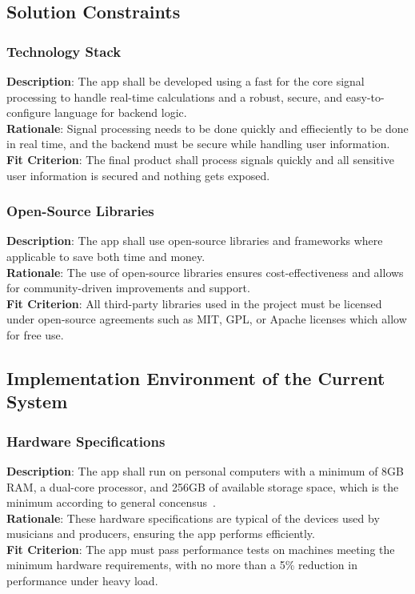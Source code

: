 \documentclass[12pt]{article}
\begin{document}
\subsection{Solution Constraints}
\subsubsection*{Technology Stack}
\textbf{Description}: The app shall be developed using a fast for the core signal processing to handle real-time calculations and a robust, secure, and easy-to-configure language for backend logic.\\
\textbf{Rationale}: Signal processing needs to be done quickly and effieciently to be done in real time, and the backend must be secure while handling user information.\\
\textbf{Fit Criterion}: The final product shall process signals quickly and all sensitive user information is secured and nothing gets exposed.
\subsubsection*{Open-Source Libraries}
\textbf{Description}: The app shall use open-source libraries and frameworks where applicable to save both time and money.\\
\textbf{Rationale}: The use of open-source libraries ensures cost-effectiveness and allows for community-driven improvements and support.\\
\textbf{Fit Criterion}: All third-party libraries used in the project must be licensed under open-source agreements such as MIT, GPL, or Apache licenses which allow for free use.

\subsection{Implementation Environment of the Current System}
\subsubsection*{Hardware Specifications}
\textbf{Description}: The app shall run on personal computers with a minimum of 8GB RAM, a dual-core processor, and 256GB of available storage space, which is the minimum according to general concensus~\cite{music-specs}.\\
\textbf{Rationale}: These hardware specifications are typical of the devices used by musicians and producers, ensuring the app performs efficiently.\\
\textbf{Fit Criterion}: The app must pass performance tests on machines meeting the minimum hardware requirements, with no more than a 5\% reduction in performance under heavy load.
\end{document}
